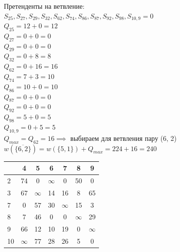 Претенденты на ветвление:\\
$S_{25}, S_{27}, S_{29}, S_{32}, S_{62}, S_{74}, S_{86}, S_{87}, S_{92}, S_{98}, S_{10,9} = 0$\\
$Q_{25} = 12 + 0 = 12$\\
$Q_{27} = 0 + 0 = 0$\\
$Q_{29} = 0 + 0 = 0$\\
$Q_{32} = 0 + 8 = 8$\\
$Q_{62} = 0 + 16 = 16$\\
$Q_{74} = 7 + 3 = 10$\\
$Q_{86} = 10 + 0 = 10$\\
$Q_{87} = 0 + 0 = 0$\\
$Q_{92} = 0 + 0 = 0$\\
$Q_{98} = 5 + 0 = 5$\\
$Q_{10,9} = 0 + 5 = 5$\\

$Q_{max} = Q_{62} = 16 \implies$ выбираем для ветвления пару (6, 2)\\
$w(\{\overline{6, 2}\}) = w(\{5, 1\}) + Q_{max} = 224 + 16 = 240$

\begin{center}
    \begin{tabular}{|a | c | c | c | c | c | c|} 
         \hline
            & 4 & 5 & 6 & 7 & 8 & 9 \\
          & 74 & 0 & $\infty$ & 0 & 50 & 0 \\
          & 67 & $\infty$ & 14 & 16 & 8 & 65 \\
          & 0 & 57 & 30 & $\infty$ & 15 & 3 \\
          & 7 & 46 & 0 & 0 & $\infty$ & 29 \\
         & 66 & 12 & 10 & 19 & 0 & $\infty$ \\
          & $\infty$ & 77 & 28 & 26 & 5 & 0 \\
        \hline
    \end{tabular}
\end{center}


